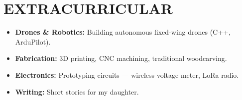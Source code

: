 \documentclass[letterpaper,11pt]{article}
\newcommand{\resumeItemNoBullet}[1]{
  \item[] \small{
    {#1 \vspace{-2pt}}
  }
}
\newcommand{\resumeSubHeadingListStart}{\begin{itemize}[leftmargin=0.0in, label={}]}
\newcommand{\resumeSubHeadingListEnd}{\end{itemize}}
\begin{document}
\section{EXTRACURRICULAR}
\resumeSubHeadingListStart
  \resumeItemNoBullet{\normalsize{\textbf{Drones \& Robotics:} Building autonomous fixed-wing drones (C++, ArduPilot).}}
  \resumeItemNoBullet{\normalsize{\textbf{Fabrication:} 3D printing, CNC machining, traditional woodcarving.}}
  \resumeItemNoBullet{\normalsize{\textbf{Electronics:} Prototyping circuits — wireless voltage meter, LoRa radio.}}
  \resumeItemNoBullet{\normalsize{\textbf{Writing:} Short stories for my daughter.}}
\resumeSubHeadingListEnd
\end{document}
